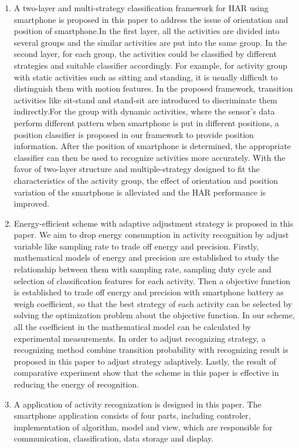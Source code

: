 \begin{enabstract}
\begin{enumerate}
	\item A two-layer and multi-strategy classification framework for HAR using smartphone is proposed in this paper to address the issue of orientation and position of smartphone.In the first layer, all the activities are divided into several groups and the similar activities are put into the same group. In the second layer, for each group, the activities could be classified by different strategies and suitable classifier accordingly. For example, for activity group with static activities such as sitting and standing, it is usually difficult to distinguish them with motion features. In the proposed framework, transition activities like sit-stand and stand-sit are introduced to discriminate them indirectly.For the group with dynamic activities, where the sensor’s data perform different pattern when smartphone is put in different positions, a position classifier is proposed in our framework to provide position information. After the position of smartphone is determined, the appropriate classifier can then be used to recognize activities more accurately. With the favor of two-layer structure and multiple-strategy designed to fit the characteristics of the activity group, the effect of orientation and position variation of the smartphone is alleviated and the HAR performance is improved.
	\item Energy-efficient scheme with adaptive adjustment strategy is proposed in this paper. We aim to drop energy consumption in activity recognition by adjust variable like sampling rate to trade off energy and precision. Firstly, mathematical models of energy and precision are established to study the relationship between them with sampling rate, sampling duty cycle and selection of classification features for each activity. Then a objective function is established to trade off energy and precision with smartphone battery as weigh coefficient, so that the best strategy of each activity can be selected by solving the optimization problem about the objective function. In our scheme, all the coefficient in the mathematical model can be calculated by experimental measurements. In order to adjust recognizing strategy, a recognizing method combine transition probability with recognizing result is proposed in this paper to adjust strategy adaptively. Lastly, the result of comparative experiment show that the scheme in this paper is effective in reducing the energy of recognition.
	\item A application of activity recognization is designed in this paper. The smartphone application consists of four parts, including controler, implementation of algorithm, model and view, which are responsible for communication, classification, data storage and display.
 \end{enumerate}
\end{enabstract}
